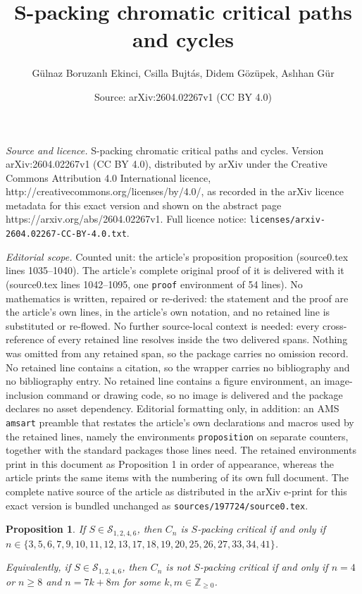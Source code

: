 \documentclass[10pt,a4paper]{amsart}
\title{S-packing chromatic critical paths and cycles}
\author{G\"ulnaz Boruzanl{\i} Ekinci, Csilla Bujt\'as, Didem G\"oz\"upek, Asl{\i}han G\"ur}
\date{Source: arXiv:2604.02267v1 (CC BY 4.0)}
\newtheorem{proposition}{Proposition}
\begin{document}
\maketitle

\noindent\emph{Source and licence.} S-packing chromatic critical paths and cycles. Version arXiv:2604.02267v1 (CC BY 4.0), distributed by arXiv under the Creative Commons Attribution 4.0 International licence, http://creativecommons.org/licenses/by/4.0/, as recorded in the arXiv licence metadata for this exact version and shown on the abstract page https://arxiv.org/abs/2604.02267v1. Full licence notice: \texttt{licenses/arxiv-2604.02267-CC-BY-4.0.txt}.\par\smallskip

\noindent\textit{Editorial scope.} Counted unit: the article's proposition proposition (source0.tex lines 1035--1040). The article's complete original proof of it is delivered with it (source0.tex lines 1042--1095, one \texttt{proof} environment of 54 lines). No mathematics is written, repaired or re-derived: the statement and the proof are the article's own lines, in the article's own notation, and no retained line is substituted or re-flowed.  No further source-local context is needed: every cross-reference of every retained line resolves inside the two delivered spans.  Nothing was omitted from any retained span, so the package carries no omission record.  No retained line contains a citation, so the wrapper carries no bibliography and no bibliography entry.  No retained line contains a figure environment, an image-inclusion command or drawing code, so no image is delivered and the package declares no asset dependency.  Editorial formatting only, in addition: an AMS \texttt{amsart} preamble that restates the article's own declarations and macros used by the retained lines, namely the environments \texttt{proposition} on separate counters, together with the standard packages those lines need.  The retained environments print in this document as Proposition 1 in order of appearance, whereas the article prints the same items with the numbering of its own full document.  The complete native source of the article as distributed in the arXiv e-print for this exact version is bundled unchanged as \texttt{sources/197724/source0.tex}.
\begin{proposition}
	If $S \in \mathcal{S}_{1,2,4,6}$, then $C_n$ is $S$-packing critical if and only if $n \in \{3, 5, 6, 7, 9, 10, 11,\allowbreak 12, 13, 17, 18, 19, 20, 25, 26, 27, 33, 34, 41\}$. 
	
	Equivalently, if $S \in \mathcal{S}_{1,2,4,6}$, then $C_n$ is not $S$-packing critical 
	if and only if $n = 4$ or $n \ge 8$ and $n = 7k + 8m$ for some $k,m \in \mathbb{Z}_{\ge 0}$.
\end{proposition}
\end{document}
